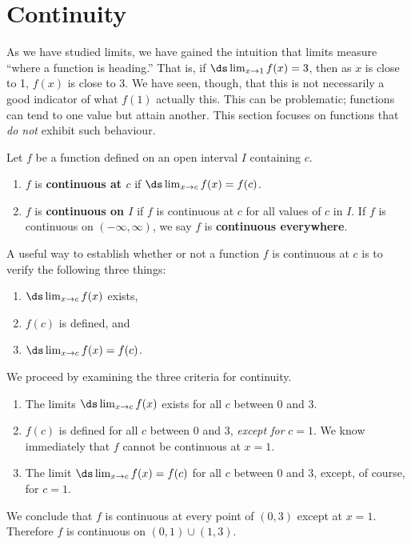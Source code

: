 \section{Continuity}\label{sec:continuity}
As we have studied limits, we have gained the intuition that limits measure ``where a function is heading.'' That is, if $\ds \lim_{x\to 1} f(x) = 3$, then as $x$ is close to 1, $f(x)$ is close to 3. We have seen, though, that this is not necessarily a good indicator of what $f(1)$ actually this. This can be problematic; functions can tend to one value but attain another. This section focuses on functions that \textit{do not} exhibit such behaviour.

{Let $f$ be a function defined on an open interval $I$ containing $c$.  
	\begin{enumerate}
	\item		$f$ is \textbf{continuous at $c$} if $\ds \lim_{x\to c}f(x) = f(c)$.
	\item		$f$ is \textbf{continuous on $I$} if $f$ is continuous at $c$ for all values of $c$ in $I$. If $f$ is continuous on $(-\infty,\infty)$, we say $f$ is \textbf{continuous everywhere}.
	\end{enumerate}
}

A useful way to establish whether or not a function $f$ is continuous at $c$ is to verify the following three things:
		\begin{enumerate}
		\item		$\ds \lim_{x\to c} f(x)$ exists,
		\item		$f(c)$ is defined, and 
		\item		$\ds \lim_{x\to c} f(x) = f(c)$.
		\end{enumerate}
		
{We proceed by examining the three criteria for continuity.
	\begin{enumerate}
	\item		The limits $\ds \lim_{x\to c} f(x)$ exists for all $c$ between 0 and 3.
	\item		$f(c)$ is defined for all $c$ between 0 and 3, \textit{except for} $c=1$. We know immediately that $f$ cannot be continuous at $x=1$.
	\item		The limit $\ds \lim_{x\to c} f(x) = f(c)$ for all $c$ between 0 and 3, except, of course, for $c=1$. 
	\end{enumerate}

We conclude that $f$ is continuous at every point of $(0,3)$ except at $x=1$. Therefore $f$ is continuous on $(0,1)\cup(1,3)$.}\\

